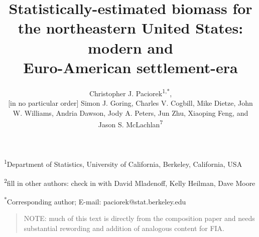 \documentclass[12pt]{article}\usepackage[]{graphicx}\usepackage[]{color}
\newcommand{\lyxaddress}[1]{
\par {\raggedright #1
\vspace{1.4em}
\noindent\par}
}
\begin{document}
\title{Statistically-estimated biomass for the northeastern United States:
modern and \\
Euro-American settlement-era}


\author{Christopher J. Paciorek\textsuperscript{1,{*}}, \\
{[}in no particular order{]} Simon J. Goring, Charles V. Cogbill,
Mike Dietze, John W. Williams, Andria Dawson, Jody A. Peters, Jun
Zhu, Xiaoping Feng, and Jason S. McLachlan\textsuperscript{7}}

\maketitle

\lyxaddress{\textsuperscript{1}Department of Statistics, University of California,
Berkeley, California, USA}


\lyxaddress{\textsuperscript{2}fill in other authors: check in with David Mladenoff,
Kelly Heilman, Dave Moore}


\lyxaddress{\textsuperscript{{*}}Corresponding author; E-mail: paciorek@stat.berkeley.edu}


\lyxaddress{\newpage}
\begin{quote}


NOTE: much of this text is directly from the composition paper and
needs substantial rewording and addition of analogous content for
FIA.
\end{quote}
\end{document}
